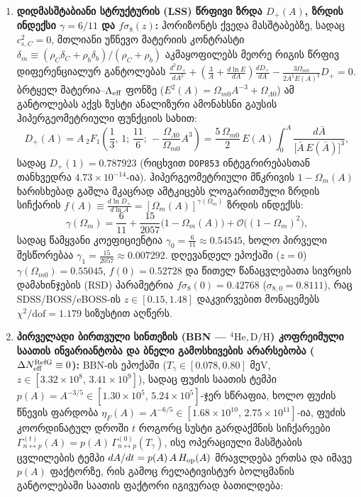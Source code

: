 \documentclass[11pt,a4paper]{article}
\begin{document}
\begin{enumerate}[label=\arabic*.]
\item \textbf{დიდმასშტაბიანი სტრუქტურის (LSS) წრფივი ზრდა $D_+(A)$, ზრდის ინდექსი $\gamma = 6/11$ და $f\sigma_8(z)$:} ჰორიზონტს ქვედა მასშტაბებზე, სადაც $c_{s,C}^2 = 0$, მთლიანი უწნევო მატერიის კონტრასტი $\delta_m \equiv (\rho_C\delta_C + \rho_b\delta_b)/(\rho_C + \rho_b)$ აკმაყოფილებს მეორე რიგის წრფივ დიფერენციალურ განტოლებას $\frac{d^2 D_+}{dA^2} + (\frac{3}{A} + \frac{d\ln E}{dA})\frac{dD_+}{dA} - \frac{3\Omega_{m0}}{2A^5 E(A)^2}D_+ = 0$. ბრტყელ მატერია–$\Lambda_{\rm eff}$ ფონზე ($E^2(A) = \Omega_{m0}A^{-3} + \Omega_{\Lambda 0}$) ამ განტოლებას აქვს ზუსტი ანალიზური ამონახსნი გაუსის ჰიპერგეომეტრიული ფუნქციის სახით:
\[
   D_+(A) = A\,{}_2F_1\!\left(\frac{1}{3},\, 1;\, \frac{11}{6};\, -\frac{\Omega_{\Lambda 0}}{\Omega_{m0}}A^3\right)
   = \frac{5\,\Omega_{m0}}{2}\,E(A)\int_0^A \frac{d\bar{A}}{\bigl[\bar{A}\,E(\bar{A})\bigr]^3},
\]
სადაც $D_+(1) = 0.787923$ (რიცხვით \texttt{DOP853} ინტეგრირებასთან თანხვედრა $4.73\times 10^{-14}$-ია). ჰიპერგეომეტრიული მწკრივის $1 - \Omega_m(A)$ ხარისხებად გაშლა მკაცრად ამტკიცებს ლოგარითმული ზრდის სიჩქარის $f(A) \equiv \frac{d\ln D_+}{d\ln A} = [\Omega_m(A)]^{\gamma(\Omega_m)}$ ზრდის ინდექსს:
\[
   \gamma(\Omega_m) = \frac{6}{11} + \frac{15}{2057}\bigl(1 - \Omega_m(A)\bigr) + \mathcal{O}\bigl((1 - \Omega_m)^2\bigr),
\]
სადაც წამყვანი კოეფიციენტია $\gamma_0 = \frac{6}{11} \approx 0.54545$, ხოლო პირველი შესწორებაა $\gamma_1 = \frac{15}{2057} \approx 0.007292$. დღევანდელ ეპოქაში ($z=0$) $\gamma(\Omega_{m0}) = 0.55045$, $f(0) = 0.52728$ და წითელ წანაცვლებათა სივრცის დამახინჯების (RSD) პარამეტრია $f\sigma_8(0) = 0.42768$ ($\sigma_{8,0} = 0.8111$), რაც SDSS/BOSS/eBOSS-ის $z \in [0.15, 1.48]$ დაკვირვებით მონაცემებს $\chi^2/\text{dof} = 1.179$ სიზუსტით აღწერს.
\item \textbf{პირველადი ბირთვული სინთეზის (BBN — ${}^4\text{He}, \text{D/H}$) კოფრეიმული საათის ინვარიანტობა და ბნელი გამოსხივების არარსებობა ($\Delta N_{\rm eff}^{\rm RefG} \equiv 0$):} BBN-ის ეპოქაში ($T_\gamma \in [0.078, 0.80]\text{ მეV}$, $z \in [3.32\times 10^8,\, 3.41\times 10^9]$), სადაც ფუძის საათის ტემპი $p(A) = A^{-3/5} \in [1.30\times 10^5,\, 5.24\times 10^5]$-ჯერ სწრაფია, ხოლო ფუძის წნევის ფარდობა $\eta_F(A) = A^{-6/5} \in [1.68\times 10^{10},\, 2.75\times 10^{11}]$-ია, ფუძის კოორდინატულ დროში $t$ როგორც სუსტი გარდაქმნის სიჩქარეები $\Gamma_{n\leftrightarrow p}^{(t)}(A) = p(A)\,\Gamma_{n\leftrightarrow p}^{(0)}(T_\gamma)$, ისე ოპერაციული მასშტაბის ცვლილების ტემპი $dA/dt = p(A)\,A\,H_{\rm op}(A)$ მრავლდება ერთსა და იმავე $p(A)$ ფაქტორზე, რის გამოც რელატივისტურ ბოლცმანის განტოლებაში საათის ფაქტორი იგივურად ბათილდება:

\end{enumerate}
\end{document}
